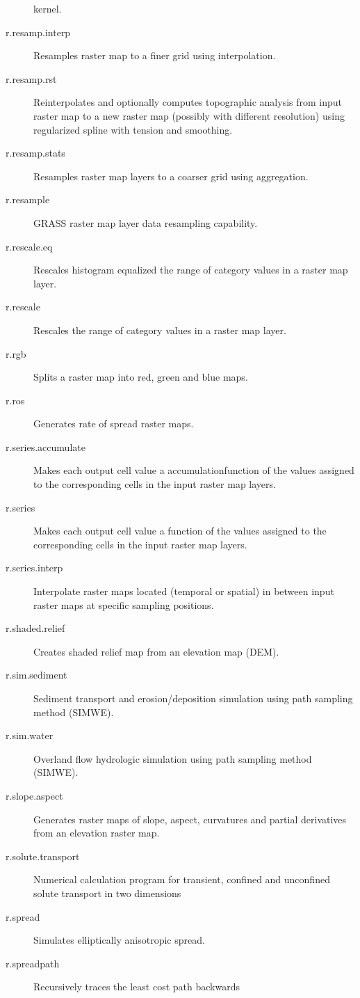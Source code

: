 \begin{description}
kernel.
\item [{r.resamp.interp}] Resamples raster map to a finer grid using interpolation.
\item [{r.resamp.rst}] Reinterpolates and optionally computes topographic
analysis from input raster map to a new raster map (possibly with
different resolution) using regularized spline with tension and smoothing.
\item [{r.resamp.stats}] Resamples raster map layers to a coarser grid
using aggregation.
\item [{r.resample}] GRASS raster map layer data resampling capability.
\item [{r.rescale.eq}] Rescales histogram equalized the range of category
values in a raster map layer.
\item [{r.rescale}] Rescales the range of category values in a raster map
layer.
\item [{r.rgb}] Splits a raster map into red, green and blue maps.
\item [{r.ros}] Generates rate of spread raster maps.
\item [{r.series.accumulate}] Makes each output cell value a accumulationfunction
of the values assigned to the corresponding cells in the input raster
map layers.
\item [{r.series}] Makes each output cell value a function of the values
assigned to the corresponding cells in the input raster map layers.
\item [{r.series.interp}] Interpolate raster maps located (temporal or
spatial) in between input raster maps at specific sampling positions.
\item [{r.shaded.relief}] Creates shaded relief map from an elevation map
(DEM).
\item [{r.sim.sediment}] Sediment transport and erosion/deposition simulation
using path sampling method (SIMWE).
\item [{r.sim.water}] Overland flow hydrologic simulation using path sampling
method (SIMWE).
\item [{r.slope.aspect}] Generates raster maps of slope, aspect, curvatures
and partial derivatives from an elevation raster map.
\item [{r.solute.transport}] Numerical calculation program for transient,
confined and unconfined solute transport in two dimensions
\item [{r.spread}] Simulates elliptically anisotropic spread.
\item [{r.spreadpath}] Recursively traces the least cost path backwards

\end{description}
